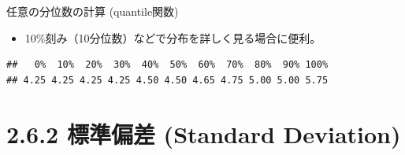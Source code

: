 \documentclass[
  ignorenonframetext,
]{beamer}
\newenvironment{Shaded}{\begin{snugshade}}{\end{snugshade}}
\newcommand{\AttributeTok}[1]{\textcolor[rgb]{0.77,0.63,0.00}{#1}}
\newcommand{\CommentTok}[1]{\textcolor[rgb]{0.56,0.35,0.01}{\textit{#1}}}
\newcommand{\DecValTok}[1]{\textcolor[rgb]{0.00,0.00,0.81}{#1}}
\newcommand{\FloatTok}[1]{\textcolor[rgb]{0.00,0.00,0.81}{#1}}
\newcommand{\FunctionTok}[1]{\textcolor[rgb]{0.00,0.00,0.00}{#1}}
\newcommand{\NormalTok}[1]{#1}
\newcommand{\SpecialCharTok}[1]{\textcolor[rgb]{0.00,0.00,0.00}{#1}}
\providecommand{\tightlist}{%
  \setlength{\itemsep}{0pt}\setlength{\parskip}{0pt}}
\begin{document}
\begin{frame}[fragile]{任意の分位数の計算 (quantile関数)}
\protect\hypertarget{ux4efbux610fux306eux5206ux4f4dux6570ux306eux8a08ux7b97-quantileux95a2ux6570}{}
\begin{itemize}
\tightlist
\item
  10\%刻み（10分位数）などで分布を詳しく見る場合に便利。
\end{itemize}

\scriptsize

\begin{Shaded}
\end{Shaded}

\begin{verbatim}
##   0%  10%  20%  30%  40%  50%  60%  70%  80%  90% 100% 
## 4.25 4.25 4.25 4.25 4.50 4.50 4.65 4.75 5.00 5.00 5.75
\end{verbatim}

\normalsize
\end{frame}

\hypertarget{ux6a19ux6e96ux504fux5dee-standard-deviation}{%
\section{2.6.2 標準偏差 (Standard
Deviation)}\label{ux6a19ux6e96ux504fux5dee-standard-deviation}}
\end{document}
